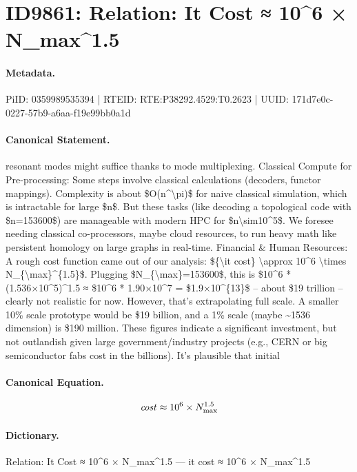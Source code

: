 \section*{ID9861: Relation: It Cost ≈ 10\textasciicircum{}6 × N\_max\textasciicircum{}1.5}
\paragraph{Metadata.}
PiID: 0359989535394 | RTEID: RTE:P38292.4529:T0.2623 | UUID: 171d7e0c-0227-57b9-a6aa-f19e99bb0a1d

\paragraph{Canonical Statement.}
resonant modes might suffice thanks to mode multiplexing. Classical Compute for Pre-processing: Some steps involve classical calculations (decoders, functor mappings). Complexity is about \$O(n\textasciicircum{}\textbackslash{}pi)\$ for naive classical simulation, which is intractable for large \$n\$. But these tasks (like decoding a topological code with \$n=153600\$) are manageable with modern HPC for \$n\textbackslash{}sim10\textasciicircum{}5\$. We foresee needing classical co-processors, maybe cloud resources, to run heavy math like persistent homology on large graphs in real-time. Financial \& Human Resources: A rough cost function came out of our analysis: \$\{\textbackslash{}it cost\} \textbackslash{}approx 10\textasciicircum{}6 \textbackslash{}times N\_\{\textbackslash{}max\}\textasciicircum{}\{1.5\}\$. Plugging \$N\_\{\textbackslash{}max\}=153600\$, this is \$10\textasciicircum{}6 * (1.536×10\textasciicircum{}5)\textasciicircum{}1.5 ≈ \$10\textasciicircum{}6 * 1.90×10\textasciicircum{}7 = \$1.9×10\textasciicircum{}\{13\}\$ – about \$19 trillion – clearly not realistic for now. However, that's extrapolating full scale. A smaller 10\% scale prototype would be \$19 billion, and a 1\% scale (maybe \textasciitilde{}1536 dimension) is \$190 million. These figures indicate a significant investment, but not outlandish given large government/industry projects (e.g., CERN or big semiconductor fabs cost in the billions). It’s plausible that initial

\paragraph{Canonical Equation.}
\[
{\it cost} \approx 10^6 \times N_{\max}^{1.5}
\]

\paragraph{Dictionary.}
Relation: It Cost ≈ 10\textasciicircum{}6 × N\_max\textasciicircum{}1.5 — it cost ≈ 10\textasciicircum{}6 × N\_max\textasciicircum{}1.5

